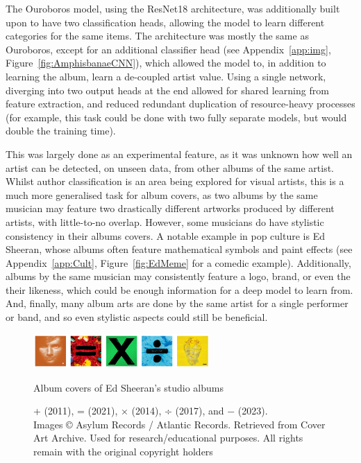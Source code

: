                 The Ouroboros model, using the ResNet18 architecture, was additionally built upon to have two classification heads, allowing the model to learn different categories for the same items. The architecture was mostly the same as Ouroboros, except for an additional classifier head (see Appendix~\ref{app:img}, Figure~\ref{fig:AmphisbanaeCNN}), which allowed the model to, in addition to learning the album, learn a de-coupled artist value. Using a single network, diverging into two output heads at the end allowed for shared learning from feature extraction, and reduced redundant duplication of resource-heavy processes (for example, this task could be done with two fully separate models, but would double the training time).
    
                This was largely done as an experimental feature, as it was unknown how well an artist can be detected, on unseen data, from other albums of the same artist. Whilst author classification is an area being explored for visual artists, this is a much more generalised task for album covers, as two albums by the same musician may feature two drastically different artworks produced by different artists, with little-to-no overlap. However, some musicians do have stylistic consistency in their albums covers. A notable example in pop culture is Ed Sheeran, whose albums often feature mathematical symbols and paint effects (see Appendix~\ref{app:Cult}, Figure~\ref{fig:EdMeme} for a comedic example). Additionally, albums by the same musician may consistently feature a logo, brand, or even the their likeness, which could be enough information for a deep model to learn from. And, finally, many album arts are done by the same artist for a single performer or band, and so even stylistic aspects could still be beneficial.
    
                \begin{figure}[h]
                    \centering
                    \includegraphics[width=0.6\textwidth]{images/EdAlbums.png}
                    \caption{Album covers of Ed Sheeran's studio albums}
                    \label{fig:EdAlbums}
                    \caption*{+ (2011), = (2021), × (2014), ÷ (2017), and − (2023). \\ Images © Asylum Records / Atlantic Records. Retrieved from Cover Art Archive. Used for research/educational purposes. All rights remain with the original copyright holders}
                \end{figure}
    
